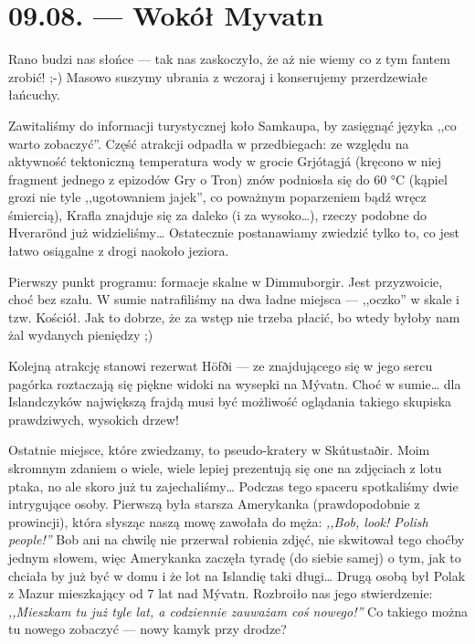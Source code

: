 \chapter*{09.08. --- Wokół Myvatn}

Rano budzi nas słońce --- tak nas zaskoczyło, że aż nie wiemy co z tym fantem zrobić! ;-) Masowo suszymy ubrania z wczoraj i konserujemy przerdzewiałe łańcuchy.

Zawitaliśmy do informacji turystycznej koło Samkaupa, by zasięgnąć języka ,,co warto zobaczyć''. Część atrakcji odpadła w przedbiegach: ze względu na aktywność tektoniczną temperatura wody w grocie Grjótagjá (kręcono w niej fragment jednego z epizodów Gry o Tron) znów podniosła się do 60 °C (kąpiel grozi nie tyle ,,ugotowaniem jajek'', co poważnym poparzeniem bądź wręcz śmiercią), Krafla znajduje się za daleko (i za wysoko…), rzeczy podobne do Hverarönd już widzieliśmy… Ostatecznie postanawiamy zwiedzić tylko to, co jest łatwo osiągalne z drogi naokoło jeziora.

Pierwszy punkt programu: formacje skalne w Dimmuborgir. Jest przyzwoicie, choć bez szału. W sumie natrafiliśmy na dwa ładne miejsca --- ,,oczko'' w skale i tzw. Kościół. Jak to dobrze, że za wstęp nie trzeba płacić, bo wtedy byłoby nam żal wydanych pieniędzy ;)


Kolejną atrakcję stanowi rezerwat Höfði --- ze znajdującego się w jego sercu pagórka roztaczają się piękne widoki na wysepki na Mývatn. Choć w sumie… dla Islandczyków największą frajdą musi być możliwość oglądania takiego skupiska prawdziwych, wysokich drzew!

Ostatnie miejsce, które zwiedzamy, to pseudo-kratery w Skútustaðir. Moim skromnym zdaniem o wiele, wiele lepiej prezentują się one na zdjęciach z lotu ptaka, no ale skoro już tu zajechaliśmy… Podczas tego spaceru spotkaliśmy dwie intrygujące osoby. Pierwszą była starsza Amerykanka (prawdopodobnie z prowincji), która słysząc naszą mowę zawołała do męża: \emph{,,Bob, look! Polish people!''} Bob ani na chwilę nie przerwał robienia zdjęć, nie skwitował tego choćby jednym słowem, więc Amerykanka zaczęła tyradę (do siebie samej) o tym, jak to chciała by już być w domu i że lot na Islandię taki długi… Drugą osobą był Polak z Mazur mieszkający od 7 lat nad Mývatn. Rozbroiło nas jego stwierdzenie: \emph{,,Mieszkam tu już tyle lat, a codziennie zauważam coś nowego!''} Co takiego można tu nowego zobaczyć --- nowy kamyk przy drodze?


